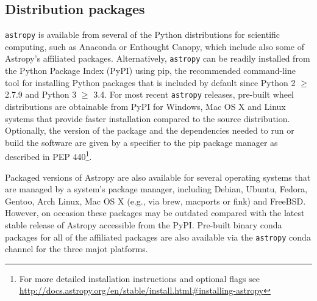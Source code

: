 \documentclass[modern]{aastex61}
\newcommand{\package}[1]{\texttt{#1}\xspace}
\newcommand{\astropy}{Astropy\xspace}
\newcommand{\astropypkg}{\package{astropy}\xspace}
\begin{document}
\subsection{Distribution packages}

\astropypkg is available from several of the Python distributions for scientific
% 
% 
computing, such as Anaconda or Enthought Canopy, which include also some of
\astropy's affiliated packages.
Alternatively, \astropypkg can be readily installed from the Python Package Index
(PyPI) using pip, the recommended command-line tool for installing Python packages
that is included by default since Python 2 $\geq$ 2.7.9 and Python 3 $\geq$ 3.4.
For most recent \astropypkg releases, pre-built wheel distributions are obtainable
from PyPI for Windows, Mac OS X and Linux systems that provide faster
installation compared to the source distribution.  Optionally, the version of
the package and the dependencies needed to run or build the software are given
by a specifier to the pip package manager as described in PEP 440\footnote{For
more detailed installation instructions and optional flags see
\url{http://docs.astropy.org/en/stable/install.html\#installing-astropy}}.

Packaged versions of \astropy are also available for several
operating systems that are managed by a system's package manager,
including Debian, Ubuntu, Fedora, Gentoo, Arch Linux, Mac OS X (e.g.,
via brew, macports or fink) and FreeBSD.  However, on occasion these packages
may be outdated compared with the latest stable release of \astropy accessible
from the PyPI. Pre-built binary conda packages for all of the affiliated packages are also available  via the \texttt{astropy} conda channel for the three majot platforms.
% 
% 

\end{document}
